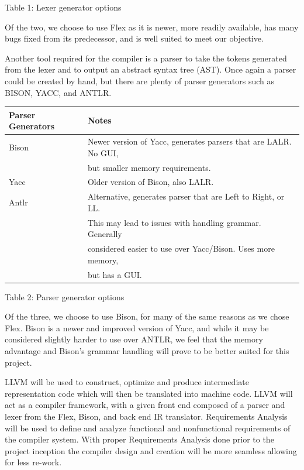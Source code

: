 \documentclass[11pt]{article}
\begin{document}
\begin{center}
Table 1: Lexer generator options
\end{center}

Of the two, we choose to use Flex as it is newer, more readily available, has many bugs fixed from its predecessor, and is well suited to meet our objective. 

Another tool required for the compiler is a parser to take the tokens generated from the lexer and to output an abstract syntax tree (AST). Once again a parser could be created by hand, but there are plenty of parser generators such as BISON, YACC, and ANTLR.

\begin{center}
\begin{tabular}{ |l | l|  }
 \hline
 \textbf{Parser Generators} & \textbf{Notes} \\
 \hline 
 Bison & Newer version of Yacc, generates parsers that are LALR. No GUI,\\
       & but smaller memory requirements. \\
 \hline 
 Yacc & Older version of Bison, also LALR. \\
 \hline
 Antlr & Alternative, generates parser that are Left to Right, or  LL.\\
       & This may lead to issues with handling grammar. Generally \\
       & considered easier to use over Yacc/Bison. Uses more memory,\\
       & but has a GUI. \\
 \hline
\end{tabular}
\end{center}

\begin{center}
Table 2: Parser generator options
\end{center}

Of the three, we choose to use Bison, for many of the same reasons as we chose Flex. Bison is a newer and improved version of Yacc, and while it may be considered slightly harder to use over ANTLR, we feel that the memory advantage and Bison’s grammar handling will prove to be better suited for this project.

 LLVM will be used to construct, optimize and produce intermediate representation code which will then be translated into machine code. LLVM will act as a compiler framework, with a given front end composed of a parser and lexer from the Flex, Bison, and back end IR translator. Requirements Analysis will be used to define and analyze functional and nonfunctional requirements of the compiler system. With proper Requirements Analysis done prior to the project inception the compiler design and creation will be more seamless allowing for less re-work. 
\end{document}
